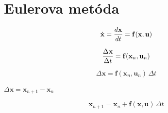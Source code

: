 \documentclass[a4paper, 10pt, ]{article}
\begin{document}
\bigskip

\normalsize
\normalfont



\section{Eulerova metóda}

\begin{equation}
    \dot{\mathbf{x}} = \frac{d \mathbf{x}}{d t} = \mathbf{f}(\mathbf{x}, \mathbf{u})
\end{equation}

\begin{equation}
    \frac{\Delta \mathbf{x}}{\Delta t} = \mathbf{f}(\mathbf{x}_{n}, \mathbf{u}_{n})
\end{equation}

\begin{equation}
    \Delta \bm{x} = \bm{f}(\bm{x}_{n}, \bm{u}_{n}) \, \Delta t
\end{equation}

$\Delta \bm{x} = \bm{x}_{n + 1} - \bm{x}_{n}$

\begin{equation}
    \bm{x}_{n + 1} = \bm{x}_{n} + \bm{f}(\bm{x}, \bm{u}) \, \Delta t
\end{equation}
\end{document}
